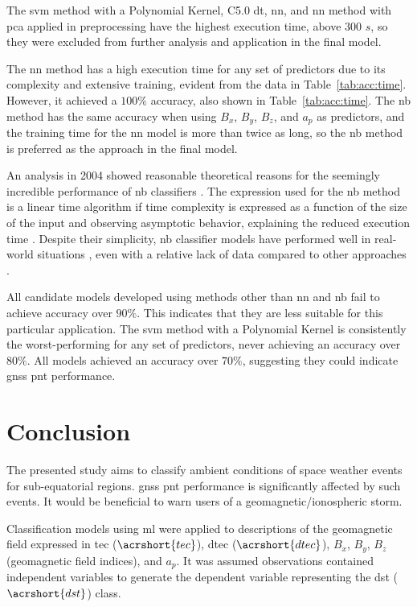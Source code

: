\let\LaTeXcline\cline\documentclass[sn-mathphys-num]{sn-jnl}\let\cline\LaTeXcline
\begin{document}
The \acrfull{svm} method with a Polynomial Kernel, C5.0 \acrfull{dt}, \acrfull{nn}, and \acrshort{nn} method with \acrfull{pca} applied in preprocessing have the highest execution time, above $300$ $s$, so they were excluded from further analysis and application in the final model.

The \acrfull{nn} method has a high execution time for any set of predictors due to its complexity and extensive training, evident from the data in Table~\ref{tab:acc:time}. However, it achieved a $100\%$ accuracy, also shown in Table~\ref{tab:acc:time}. The \acrfull{nb} method has the same accuracy when using $B_{x}$, $B_{y}$, $B_{z}$, and $a_{p}$ as predictors, and the training time for the \acrshort{nn} model is more than twice as long, so the \acrshort{nb} method is preferred as the approach in the final model.

An analysis in 2004 showed reasonable theoretical reasons for the seemingly incredible performance of \acrshort{nb} classifiers \cite{Zhang2004}. The expression used for the \acrshort{nb} method is a linear time algorithm if time complexity is expressed as a function of the size of the input and observing asymptotic behavior, explaining the reduced execution time \cite{Russell1999}. Despite their simplicity, \acrshort{nb} classifier models have performed well in real-world situations \cite{Metsis2006}, even with a relative lack of data compared to other approaches \cite{John2013, Mccallum2001}.

All candidate models developed using methods other than \acrshort{nn} and \acrshort{nb} fail to achieve accuracy over $90\%$. This indicates that they are less suitable for this particular application. The \acrshort{svm} method with a Polynomial Kernel is consistently the worst-performing for any set of predictors, never achieving an accuracy over $80\%$. All models achieved an accuracy over $70\%$, suggesting they could indicate \acrfull{gnss} \acrfull{pnt} performance.

\section{Conclusion}
\label{sec:Conclusion}

The presented study aims to classify ambient conditions of space weather events for sub-equatorial regions. \acrfull{gnss} \acrfull{pnt} performance is significantly affected by such events. It would be beneficial to warn users of a geomagnetic/ionospheric storm.

Classification models using \acrlong{ml} were applied to descriptions of the geomagnetic field expressed in \acrlong{tec} ($\acrshort{tec}$), \acrlong{dtec} ($\acrshort{dtec}$), $B_{x}$, $B_{y}$, $B_{z}$ (geomagnetic field indices), and $a_{p}$. It was assumed observations contained independent variables to generate the dependent variable representing the \acrlong{dst} ($\acrshort{dst}$) class. 
\end{document}
